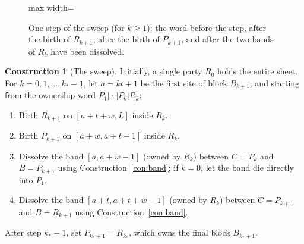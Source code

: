 \documentclass[aps,prx,reprint,superscriptaddress,floatfix,nofootinbib,longbibliography,amsmath,amssymb]{revtex4-2}
\theoremstyle{plain}
\theoremstyle{definition}
\newtheorem{construction}[theorem]{Construction}
\begin{document}
\begin{figure}[t]
\centering
\begin{adjustbox}{max width=\linewidth}

\end{adjustbox}
\caption{One step of the sweep (for $k\ge1$): the word before the step, after the birth of $R_{k+1}$, after the birth of $P_{k+1}$, and after the two bands of $R_k$ have been dissolved.}\label{fig:sweep-step}
\end{figure}

\begin{construction}[The sweep]\label{con:sweep}
Initially, a single party $R_0$ holds the entire sheet. For $k=0,1,\dots,k_*-1$, let
$a=kt+1$ be the first site of block $B_{k+1}$, and starting from the ownership word $P_1|\cdots|P_k|R_k$:
\begin{enumerate}[leftmargin=2em]
\item[(1)] Birth $R_{k+1}$ on $[a+t+w,L]$ inside $R_k$.
\item[(2)] Birth $P_{k+1}$ on $[a+w,a+t-1]$ inside $R_k$.
\item[(3)] Dissolve the band $[a,a+w-1]$ (owned by $R_k$) between $C=P_k$
and $B=P_{k+1}$ using Construction~\ref{con:band}; if $k=0$, let the band die directly
into $P_1$.
\item[(4)] Dissolve the band $[a+t,a+t+w-1]$ (owned by $R_k$) between
$C=P_{k+1}$ and $B=R_{k+1}$ using Construction~\ref{con:band}.
\end{enumerate}
After step $k_*-1$, set $P_{k_*+1}=R_{k_*}$, which owns the final block $B_{k_*+1}$.
\end{construction}
\end{document}
